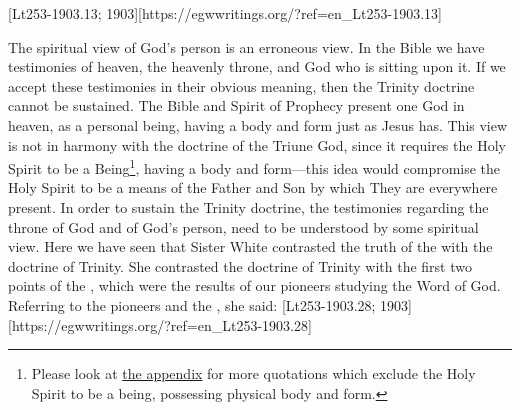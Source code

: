 [Lt253-1903.13; 1903][https://egwwritings.org/?ref=en\_Lt253-1903.13]


The spiritual view of God’s person is an erroneous view. In the Bible we have testimonies of heaven, the heavenly throne, and God who is sitting upon it. If we accept these testimonies in their obvious meaning, then the Trinity doctrine cannot be sustained. The Bible and Spirit of Prophecy present one God in heaven, as a personal being, having a body and form just as Jesus has. This view is not in harmony with the doctrine of the Triune God, since it requires the Holy Spirit to be a Being\footnote{Please look at \hyperref[appendix:unauthenticated-reports]{the appendix} for more quotations which exclude the Holy Spirit to be a being, possessing physical body and form.}, having a body and form—this idea would compromise the Holy Spirit to be a means of the Father and Son by which They are everywhere present. In order to sustain the Trinity doctrine, the testimonies regarding the throne of God and of God’s person, need to be understood by some spiritual view. Here we have seen that Sister White contrasted the truth of the  with the doctrine of Trinity. She contrasted the doctrine of Trinity with the first two points of the , which were the results of our pioneers studying the Word of God. Referring to the pioneers and the , she said: [Lt253-1903.28; 1903][https://egwwritings.org/?ref=en\_Lt253-1903.28]


